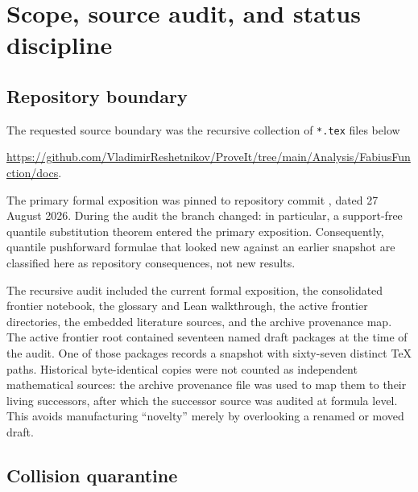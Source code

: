 \documentclass[11pt]{article}
\theoremstyle{definition}
\theoremstyle{remark}
\begin{document}
\clearpage

\section{Scope, source audit, and status discipline}
\label{p2:sec:audit}

\subsection{Repository boundary}

The requested source boundary was the recursive collection of \texttt{*.tex} files below
\begin{center}
\small
\url{https://github.com/VladimirReshetnikov/ProveIt/tree/main/Analysis/FabiusFunction/docs}.
\end{center}
The primary formal exposition was pinned to repository commit
\CommitID, dated 27 August 2026.  During the audit the
branch changed: in particular, a support-free quantile substitution theorem entered the
primary exposition.  Consequently, quantile pushforward formulae that looked new against an
earlier snapshot are classified here as repository consequences, not new results.

The recursive audit included the current formal exposition, the consolidated frontier
notebook, the glossary and Lean walkthrough, the active frontier directories, the embedded
literature sources, and the archive provenance map.  The active frontier root contained
seventeen named draft packages at the time of the audit.  One of those packages records a
snapshot with sixty-seven distinct TeX paths.  Historical byte-identical copies were not
counted as independent mathematical sources: the archive provenance file was used to map
them to their living successors, after which the successor source was audited at formula
level.  This avoids manufacturing ``novelty'' merely by overlooking a renamed or moved draft.

\subsection{Collision quarantine}
\end{document}
